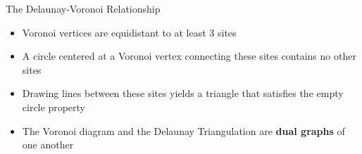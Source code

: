 \begin{frame}{The Delaunay-Voronoi Relationship}
	\begin{itemize}
		\item Voronoi vertices are equidistant to at least 3 sites
		\item A circle centered at a Voronoi vertex connecting these sites contains no other sites
		\item Drawing lines between these sites yields a triangle that satisfies the empty circle property
		\item The Voronoi diagram and the Delaunay Triangulation are \textbf{dual graphs} of one another
	\end{itemize}
	
\end{frame}
